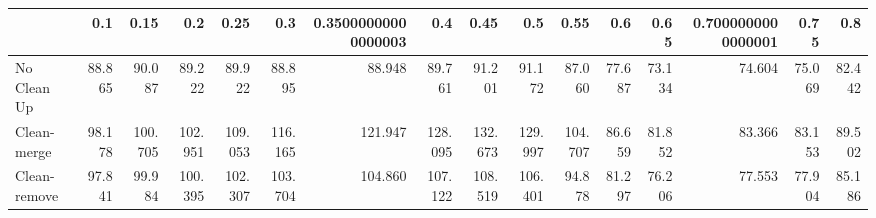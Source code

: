 \begin{tabular}{lrrrrrrrrrrrrrrr}
\toprule
{} &    0.1 &    0.15 &     0.2 &    0.25 &     0.3 & 0.35000000000000003 &     0.4 &    0.45 &     0.5 &    0.55 &    0.6 &   0.65 & 0.7000000000000001 &   0.75 &    0.8 \\
\midrule
No Clean Up  & 88.865 &  90.087 &  89.222 &  89.922 &  88.895 &              88.948 &  89.761 &  91.201 &  91.172 &  87.060 & 77.687 & 73.134 &             74.604 & 75.069 & 82.442 \\
Clean-merge  & 98.178 & 100.705 & 102.951 & 109.053 & 116.165 &             121.947 & 128.095 & 132.673 & 129.997 & 104.707 & 86.659 & 81.852 &             83.366 & 83.153 & 89.502 \\
Clean-remove & 97.841 &  99.984 & 100.395 & 102.307 & 103.704 &             104.860 & 107.122 & 108.519 & 106.401 &  94.878 & 81.297 & 76.206 &             77.553 & 77.904 & 85.186 \\
\bottomrule
\end{tabular}
